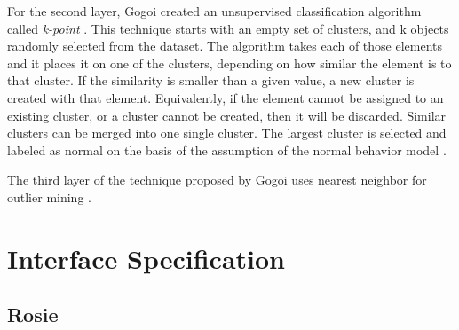 For the second layer, Gogoi \etAl \cite{Gogoi01042014} created an unsupervised classification algorithm called \textit{k-point} \cite{kPoint}. This technique starts with an empty set of clusters, and k objects randomly selected from the dataset. The algorithm takes each of those elements and it places it on one of the clusters, depending on how similar the element is to that cluster. If the similarity is smaller than a given value, a new cluster is created with that element. Equivalently, if the element cannot be assigned to an existing cluster, or a cluster cannot be created, then it will be discarded. Similar clusters can be merged into one single cluster. The largest cluster is selected and labeled as normal on the basis of the assumption of the normal behavior model \cite{Gogoi01042014}. 

The third layer of the technique proposed by Gogoi \etAl uses nearest neighbor for outlier mining \cite{Gogoi01042014}.


\section{Interface Specification}

\subsection{Rosie}


